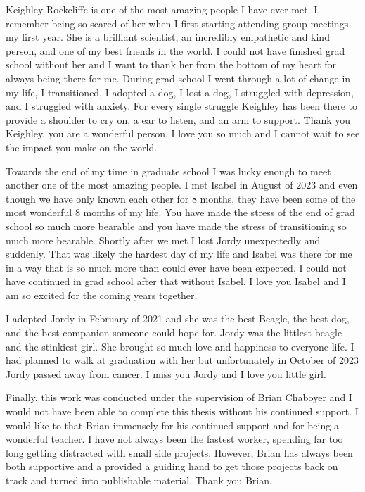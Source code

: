 Keighley Rockcliffe is one of the most amazing people I have ever met. I
remember being so scared of her when I first starting attending group meetings
my first year. She is a brilliant scientist, an incredibly empathetic and kind
person, and one of my best friends in the world. I could not have finished grad
school without her and I want to thank her from the bottom of my heart for
always being there for me. During grad school I went through a lot of change in
my life, I transitioned, I adopted a dog, I lost a dog, I struggled with
depression, and I struggled with anxiety. For every single struggle Keighley has
been there to provide a shoulder to cry on, a ear to listen, and an arm to
support. Thank you Keighley, you are a wonderful person, I love you so much and
I cannot wait to see the impact you make on the world.

Towards the end of my time in graduate school I was lucky enough to meet another
one of the most amazing people. I met Isabel in August of 2023 and even though
we have only known each other for 8 months, they have been some of the most
wonderful 8 months of my life. You have made the stress of the end of grad
school so much more bearable and you have made the stress of transitioning so
much more bearable. Shortly after we met I lost Jordy unexpectedly and
suddenly. That was likely the hardest day of my life and Isabel was there for
me in a way that is so much more than could ever have been expected. I could
not have continued in grad school after that without Isabel. I love you Isabel
and I am so excited for the coming years together.

I adopted Jordy in February of 2021 and she was the best Beagle, the best dog, and
the best companion someone could hope for. Jordy was the littlest beagle and the
stinkiest girl. She brought so much love and happiness to everyone life. I 
had planned to walk at graduation with her but unfortunately in October of 2023 
Jordy passed away from cancer. I miss you Jordy and I love you little girl.

Finally, this work was conducted under the supervision of Brian Chaboyer and I
would not have been able to complete this thesis without his continued support.
I would like to that Brian immensely for his continued support and for being a
wonderful teacher. I have not always been the fastest worker, spending far too
long getting distracted with small side projects. However, Brian has always
been both supportive and a provided a guiding hand to get those projects back
on track and turned into publishable material. Thank you Brian.
